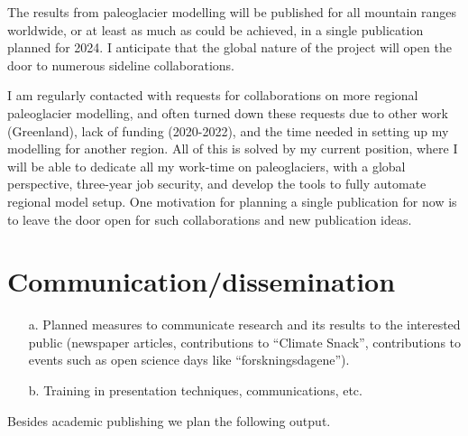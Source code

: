 \documentclass{article}
\newcommand{\guideline}[1]{{\color{color2}\itshape{#1}}}
\begin{document}
    The results from paleoglacier modelling will be published for all mountain
    ranges worldwide, or at least as much as could be achieved, in a single
    publication planned for 2024. I anticipate that the global nature of the
    project will open the door to numerous sideline collaborations.

    I am regularly contacted with requests for collaborations on more regional
    paleoglacier modelling, and often turned down these requests due to other
    work (Greenland), lack of funding (2020-2022), and the time needed in
    setting up my modelling for another region. All of this is solved by my
    current position, where I will be able to dedicate all my work-time on
    paleoglaciers, with a global perspective, three-year job security, and
    develop the tools to fully automate regional model setup. One motivation
    for planning a single publication for now is to leave the door open for
    such collaborations and new publication ideas.


\section{Communication/dissemination}

    \guideline{
        \begin{itemize}
          \item[a.] Planned measures to communicate research and its results to
            the interested public (newspaper articles, contributions to
            ``Climate Snack'', contributions to events such as open science
            days like ``forskningsdagene'').
          \item[b.] Training in presentation techniques, communications, etc.
        \end{itemize}}

    Besides academic publishing we plan the following output.
\end{document}
